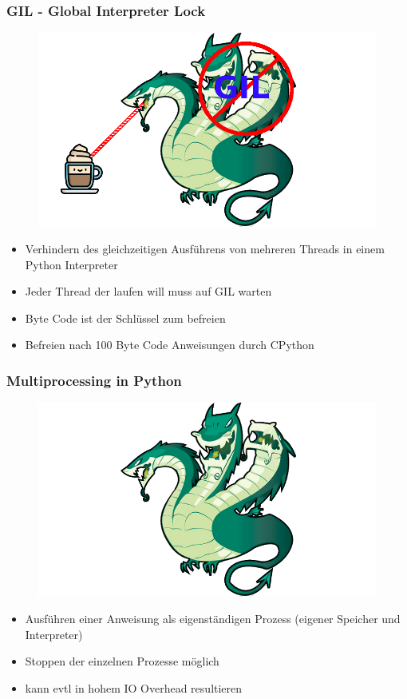 \documentclass[12pt,utf8, handout]{beamer}
\begin{document}
\begin{frame}
\frametitle{GIL - Global Interpreter Lock}
\begin{figure}
\includegraphics[scale=0.2]{img/hydra1.png}
\end{figure}
\begin{itemize}
	\item Verhindern des gleichzeitigen Ausführens von mehreren Threads in einem Python Interpreter
	\item Jeder Thread der laufen will muss auf GIL warten
	\item Byte Code ist der Schlüssel zum befreien
	\item Befreien nach 100 Byte Code Anweisungen durch CPython
\end{itemize}
\end{frame}

\begin{frame}
\frametitle{Multiprocessing in Python}
\begin{figure}
\includegraphics[scale=0.2]{img/hydra.png}
\end{figure}
\begin{itemize}
	\item Ausführen einer Anweisung als eigenständigen Prozess (eigener Speicher und Interpreter)
	\item Stoppen der einzelnen Prozesse möglich
	\item kann evtl in hohem IO Overhead resultieren
\end{itemize}
\end{frame}
\end{document}
